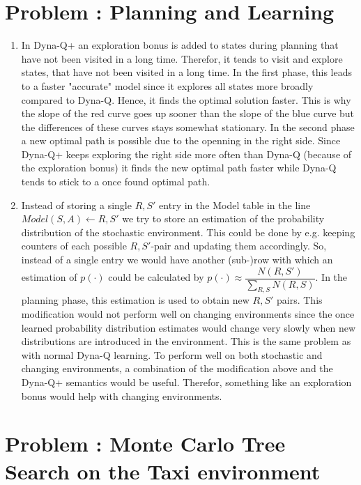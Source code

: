 \documentclass[12pt]{scrartcl}
\newcounter{exnum}
\newcommand{\exercise}[1]{\section*{Problem \theexnum\stepcounter{exnum}: #1}}
\begin{document}
\setcounter{exnum}{1}
\exercise{Planning and Learning}

\begin{enumerate}
  \item In Dyna-Q+ an exploration bonus is added to states during planning that have not been visited in a long time.
        Therefor, it tends to visit and explore states, that have not been visited in a long time.
        In the first phase, this leads to a faster "accurate" model since it explores all states
        more broadly compared to Dyna-Q. Hence, it finds the optimal solution faster.
        This is why the slope of the red curve goes up sooner than the slope of the blue curve
        but the differences of these curves stays somewhat stationary.
        In the second phase a new optimal path is possible due to the openning in the right side.
        Since Dyna-Q+ keeps exploring the right side more often than Dyna-Q (because of the exploration bonus)
        it finds the new optimal path faster while Dyna-Q tends to stick to a once found optimal path.
  \item Instead of storing a single $R, S'$ entry in the Model table in the line $Model(S, A) \leftarrow R, S'$ we try
        to store an estimation of the probability distribution of the stochastic environment.
        This could be done by e.g. keeping counters of each possible $R, S'$-pair and updating them accordingly.
        So, instead of a single entry we would have another (sub-)row with which an estimation of $p(\cdot)$ could be calculated
        by $p(\cdot) \approx \dfrac{N(R, S')}{\sum_{R, S} N(R, S)}$. In the planning phase, this estimation is used to obtain new $R, S'$ pairs.
        This modification would not perform well on changing environments since the once learned probability distribution estimates
        would change very slowly when new distributions are introduced in the environment. This is the same problem as with normal Dyna-Q learning.
        To perform well on both stochastic and changing environments, a combination of the modification above and the Dyna-Q+ semantics
        would be useful. Therefor, something like an exploration bonus would help with changing environments.
\end{enumerate}

\exercise{Monte Carlo Tree Search on the Taxi environment}
\end{document}

